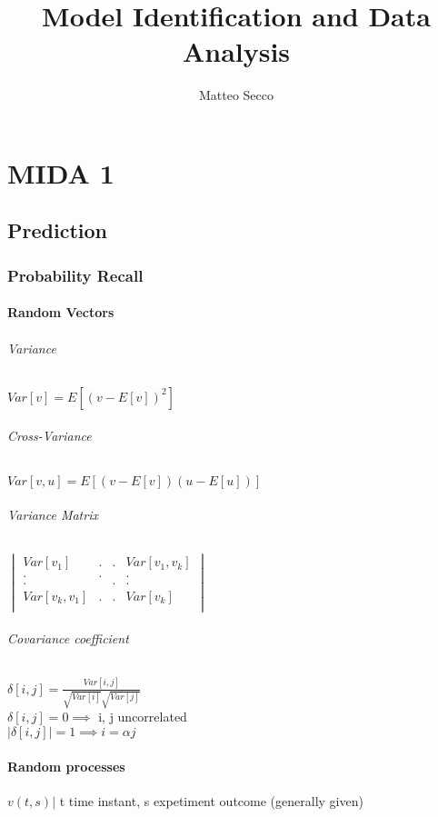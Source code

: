 \documentclass{report}
\title{Model Identification and Data Analysis}
\author{Matteo Secco}
\let\OldPart\part
\renewcommand{\part}{\newpage\OldPart}
\begin{document}
\maketitle
\newpage
\tableofcontents
\newpage

\part{MIDA 1}
\chapter{Prediction}
\section{Probability Recall}

\subsection{Random Vectors}

\paragraph{Variance}
$Var[v]=E[(v-E[v])^2]$
\paragraph{Cross-Variance}
$Var[v,u]=E[(v-E[v])(u-E[u])]$
\paragraph{Variance Matrix}
$\begin{vmatrix}
	Var[v_1]			&	.	&	.	&	Var[v_1,v_k]		\\
		.			&	.	&		&		.			\\
		.			&		&	.	&		.			\\
	Var[v_k,v_1]		&	.	&	.	&	Var[v_k]			\\
				
\end{vmatrix}$
\paragraph{Covariance coefficient}
	$\delta[i,j]=\frac{Var[i,j]}{\sqrt{Var[i]}\sqrt{Var[j]}}$\\
	$\delta[i,j]=0 \implies$ i, j uncorrelated\\
	$\left|\delta[i,j]\right|=1 \implies i=\alpha j$
	
\subsection{Random processes} $v(t,s) |$ t time instant, s expetiment outcome (generally given)
\end{document}
